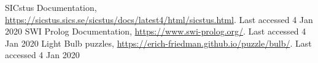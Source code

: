 \documentclass[runningheads]{llncs}
\begin{document}
%
%
% 
% 
%
\begin{thebibliography}{8}
SICstus Documentation, \url{https://sicstus.sics.se/sicstus/docs/latest4/html/sicstus.html}. Last accessed 4
Jan 2020
SWI Prolog Documentation, \url{https://www.swi-prolog.org/}. Last accessed 4
Jan 2020
Light Bulb puzzles, \url{https://erich-friedman.github.io/puzzle/bulb/}. Last accessed 4 Jan 2020
\end{thebibliography}
\end{document}
